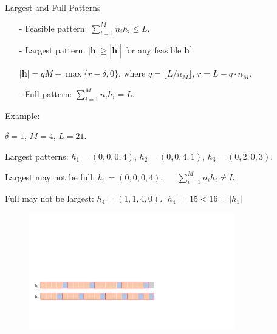   \begin{frame}{Largest and Full Patterns}
    \begin{itemize}
      \item[-] Feasible pattern: $\sum_{i=1}^{M} n_i h_i \leq L$.
      
      \item[-] {\color{red}Largest} pattern: $|\bm{h}| \geq |\bm{h}^{\prime}|$ for any feasible $\bm{h}^{\prime}$.
      
      $|\bm{h}| = qM + \max\{r-\delta, 0\}$, where $q = \lfloor L/n_M \rfloor$, $r = L - q \cdot n_M$.
      
      \item[-] {\color{red}Full} pattern: $\sum_{i=1}^{M} n_i h_i = L$.  
    \end{itemize}

     {\color{green} Example}: 
      
      $\delta = 1$, $M =4$, $L = 21$.
      
      Largest patterns: $h_1 = (0, 0, 0, 4)$, $h_2 = (0, 0, 4, 1)$, $h_3 = (0, 2, 0, 3)$.

      Largest may not be full: $h_1 = (0, 0, 0, 4)$. {\color{red} $\quad$ $\sum_{i=1}^{M} n_i h_i \neq L$}

      Full may not be largest: $h_4 = (1, 1, 4, 0)$. {\color{red} $|h_4| = 15 < 16 = |h_1|$}

      \begin{figure}[ht]
        \centering
        \includegraphics[width = 0.8\textwidth]{./images/full_largest.pdf}
      \end{figure}
  \end{frame}




  


